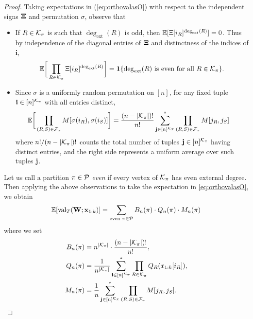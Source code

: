 \documentclass[10pt,reqno]{amsart}
\def\x{\mathbf{x}}
\def\W{\mathbf{W}}
\def\val{\operatorname{val}}
\def\1{\mathbf{1}}
\def\bi{\mathbf{i}}
\newcommand{\degext}{\deg_\mathrm{ext}}
\begin{document}
\begin{proof}
Taking expectations in (\ref{eq:orthovalasO})
with respect to the independent signs $\bm{\Xi}$ and
permutation $\sigma$, observe that
\begin{itemize}
\item If $R\in\mathcal{K}_\pi$ is such that 
$\degext(R)$ is odd, then $\EE[\Xi[i_R]^{\degext(R)}]=0$.
Thus by independence of the diagonal entries of $\bm{\Xi}$ and distinctness of the
indices of $\bi$,
\begin{align}\label{eq:sign}
	\EE\bigg[\prod_{R\in\cK_\pi} \Xi[i_R]^{\degext(R)}\bigg] = 
	\1\{\degext(R) \text{ is even for all } R\in\cK_\pi\}.
\end{align}
\item Since $\sigma$ is a uniformly random permutation on $[n]$,
for any fixed tuple $\bi \in [n]^{\cK_\pi}$ with all entries distinct,
\begin{align}\label{eq:permutation}
	\mathbb{E}\bigg[\prod_{(R,S)\in\mathcal{F}_\pi} M[\sigma(i_R),\sigma(i_S)]\bigg]
	&= \frac{(n-|\mathcal{K}_\pi|)!}{n!} \sum_{\mathbf{j}\in[n]^{\mathcal{K}_\pi}}^* 
	\prod_{(R,S)\in\mathcal{F}_\pi} M[j_R,j_S]
\end{align}
where $n!/(n-|\mathcal{K}_\pi|)!$ counts the total number of tuples
$\mathbf{j} \in [n]^{\mathcal{K}_\pi}$ having distinct entries, and the right side
represents a uniform average over such tuples $\mathbf{j}$.
\end{itemize}

Let us call a partition $\pi\in\mathcal{P}$ \emph{even} if  
every vertex of $\mathcal{K}_\pi$ has even external degree.
Then applying the above observations to take the expectation in
\eqref{eq:orthovalasO}, we obtain
\begin{equation}\label{eq:orthoval3}
\EE[\val_T(\W;\x_{1:k})] = \sum_{\text{even }\pi\in\cP}
B_n(\pi) \cdot Q_n(\pi) \cdot M_n(\pi)
\end{equation}
where we set
\begin{align}
B_n(\pi)&=n^{|\cK_\pi|} \cdot \frac{(n-|\cK_\pi|)!}{n!},\label{eq:An}\\
Q_n(\pi)&=\frac{1}{n^{|\cK_\pi|}} \sum_{\bi \in [n]^{\cK_\pi}}^*
	\prod_{R \in \cK_\pi} Q_R(x_{1:k}[i_R]),\label{eq:Qn}\\
M_n(\pi)&=\frac{1}{n}\sum_{\bj \in [n]^{\cK_\pi}}^* 
	\prod_{(R,S)\in\cF_\pi} M[j_R,j_S].\label{eq:Mn}
\end{align}


\end{proof}
\end{document}
